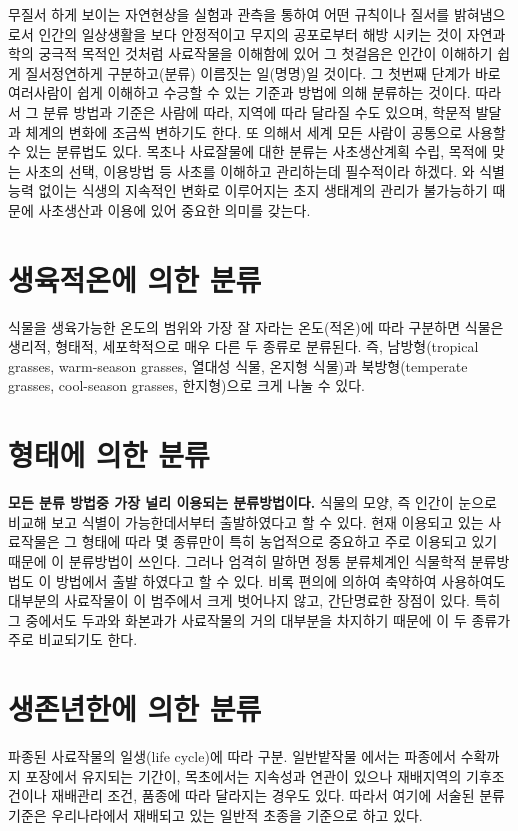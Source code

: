 \documentclass[]{book}
\begin{document}
무질서 하게 보이는 자연현상을 실험과 관측을 통하여 어떤 규칙이나 질서를
밝혀냄으로서 인간의 일상생활을 보다 안정적이고 무지의 공포로부터 해방
시키는 것이 자연과학의 궁극적 목적인 것처럼 사료작물을 이해함에 있어 그
첫걸음은 인간이 이해하기 쉽게 질서정연하게 구분하고(분류) 이름짓는
일(명명)일 것이다. 그 첫번째 단계가 바로 여러사람이 쉽게 이해하고 수긍할
수 있는 기준과 방법에 의해 분류하는 것이다. 따라서 그 분류 방법과 기준은
사람에 따라, 지역에 따라 달라질 수도 있으며, 학문적 발달과 체계의 변화에
조금씩 변하기도 한다. 또 의해서 세계 모든 사람이 공통으로 사용할 수 있는
분류법도 있다. 목초나 사료잘물에 대한 분류는 사초생산계획 수립, 목적에
맞는 사초의 선택, 이용방법 등 사초를 이해하고 관리하는데 필수적이라
하겠다. 와 식별능력 없이는 식생의 지속적인 변화로 이루어지는 초지
생태계의 관리가 불가능하기 때문에 사초생산과 이용에 있어 중요한 의미를
갖는다.

\section{생육적온에 의한 분류}\label{--}

식물을 생육가능한 온도의 범위와 가장 잘 자라는 온도(적온)에 따라
구분하면 식물은 생리적, 형태적, 세포학적으로 매우 다른 두 종류로
분류된다. 즉, 남방형(tropical grasses, warm-season grasses, 열대성 식물,
온지형 식물)과 북방형(temperate grasses, cool-season grasses,
한지형)으로 크게 나눌 수 있다.

\section{형태에 의한 분류}\label{--}

\textbf{모든 분류 방법중 가장 널리 이용되는 분류방법이다.} 식물의 모양,
즉 인간이 눈으로 비교해 보고 식별이 가능한데서부터 출발하였다고 할 수
있다. 현재 이용되고 있는 사료작물은 그 형태에 따라 몇 종류만이 특히
농업적으로 중요하고 주로 이용되고 있기 때문에 이 분류방법이 쓰인다.
그러나 엄격히 말하면 정통 분류체계인 식물학적 분류방법도 이 방법에서
출발 하였다고 할 수 있다. 비록 편의에 의하여 축약하여 사용하여도
대부분의 사료작물이 이 범주에서 크게 벗어나지 않고, 간단명료한 장점이
있다. 특히 그 중에서도 두과와 화본과가 사료작물의 거의 대부분을 차지하기
때문에 이 두 종류가 주로 비교되기도 한다.

\section{생존년한에 의한 분류}\label{--}

파종된 사료작물의 일생(life cycle)에 따라 구분. 일반밭작물 에서는
파종에서 수확까지 포장에서 유지되는 기간이, 목초에서는 지속성과 연관이
있으나 재배지역의 기후조건이나 재배관리 조건, 품종에 따라 달라지는
경우도 있다. 따라서 여기에 서술된 분류기준은 우리나라에서 재배되고 있는
일반적 초종을 기준으로 하고 있다.
\end{document}
